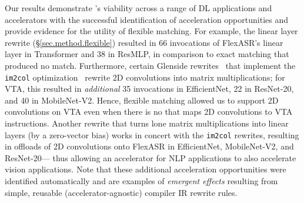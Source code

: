 Our results demonstrate \TLA's viability across a range of DL applications and accelerators with the successful identification of acceleration opportunities
%
and provide
evidence for the utility of flexible matching. %
%
%
%
For example, the linear layer rewrite %
(\S\ref{sec.method.flexible})
  resulted in 66 invocations of FlexASR's linear layer
  in Transformer and 38 in ResMLP, in comparison to exact matching that produced no match. 
Furthermore, certain Glenside rewrites~\cite{smith2021pure} that implement the \texttt{im2col} optimization~\cite{chellapilla2006high} 
rewrite 2D convolutions into matrix multiplications;
for VTA, this resulted in \emph{additional} 35 invocations in EfficientNet, 22 in ResNet-20, and 40 in MobileNet-V2.
Hence, flexible matching allowed us to support 2D convolutions on VTA even when 
there is no \mapping that maps 2D convolutions to VTA instructions.
Another rewrite
  that turns lone matrix multiplications
  into linear layers
  (by a zero-vector bias)
  works in concert with the \texttt{im2col} rewrites,
  resulting in offloads of 2D convolutions
  onto FlexASR  
  in EfficientNet, MobileNet-V2, and ResNet-20---%
  thus allowing an accelerator for NLP applications
  to also accelerate vision applications.
%
Note that these additional acceleration opportunities
  were identified automatically
  and are examples of \textit{emergent effects} resulting from simple, reusable (accelerator-agnostic) compiler IR rewrite rules.

